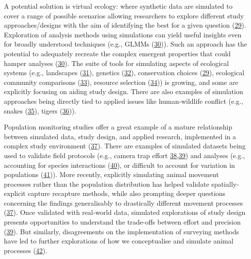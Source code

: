 \documentclass[10pt,a4paper]{article}
\begin{document}
A potential solution is virtual ecology: where synthetic data are simulated to cover a range of possible scenarios allowing researchers to explore different study approaches/designs with the aim of identifying the best for a given question (\protect\hyperlink{ref-gupta_reserve_2019}{29}).
Exploration of analysis methods using simulations can yield useful insights even for broadly understood techniques (e.g., GLMMs (\protect\hyperlink{ref-debruine_understanding_2021}{30})).
Such an approach has the potential to adequately recreate the complex emergent properties that could hamper analyses (\protect\hyperlink{ref-debruine_understanding_2021}{30}).
The suite of tools for simulating aspects of ecological systems (e.g., landscapes (\protect\hyperlink{ref-Sciaini2018}{31}), genetics (\protect\hyperlink{ref-petr_slendr_2022}{32}), conservation choices (\protect\hyperlink{ref-gupta_reserve_2019}{29}), ecological community comparisons (\protect\hyperlink{ref-guerracastro_ssp_2021}{33}), resource selection (\protect\hyperlink{ref-street_solving_2021}{34})) is growing, and some are explicitly focusing on aiding study design.
There are also examples of simulation approaches being directly tied to applied issues like human-wildlife conflict (e.g., snakes (\protect\hyperlink{ref-goldstein_integrating_2021}{35}), tigers (\protect\hyperlink{ref-Ahearn2001}{36})).

Population monitoring studies offer a great example of a mature relationship between simulated data, study design, and applied research, implemented in a complex study environment (\protect\hyperlink{ref-theng_confronting_2022}{37}).
There are examples of simulated datasets being used to validate field protocols (e.g., camera trap effort \protect\hyperlink{ref-howe_distance_2017}{38},\protect\hyperlink{ref-cappelle_estimating_2021}{39}) and analyses (e.g., accounting for species interactions (\protect\hyperlink{ref-kellner_two-species_2022}{40}), or difficult to account for variation in populations (\protect\hyperlink{ref-milleret_estimating_2022}{41})).
More recently, explicitly simulating animal movement processes rather than the population distribution has helped validate spatially-explicit capture recapture methods, while also prompting deeper questions concerning the findings generalisably to drastically different movement processes (\protect\hyperlink{ref-theng_confronting_2022}{37}).
Once validated with real-world data, simulated explorations of study design presents opportunities to understand the trade-offs between effort and precision (\protect\hyperlink{ref-cappelle_estimating_2021}{39}).
But similarly, disagreements on the implementation of surveying methods have led to further explorations of how we conceptualise and simulate animal processes (\protect\hyperlink{ref-abolaffio_avoiding_2019}{42}).
\end{document}
